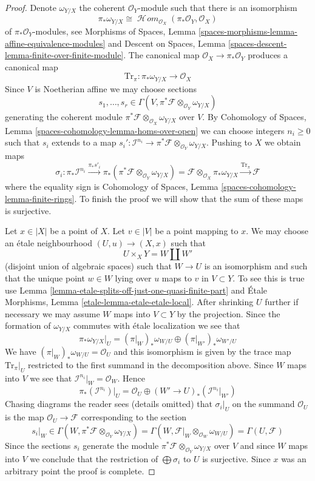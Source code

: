 \documentclass[10pt,a4paper]{amsart}
\theoremstyle{plain}
\theoremstyle{definition}
\theoremstyle{remark}
\numberwithin{equation}{subsection}
\def\SheafHom{\mathop{\mathcal{H}\!\mathit{om}}\nolimits}
\begin{document}
\begin{proof}
Denote $\omega_{Y/X}$ the coherent $\mathcal{O}_Y$-module such that there
is an isomorphism
$$
\pi_*\omega_{Y/X} \cong
\SheafHom_{\mathcal{O}_X}(\pi_*\mathcal{O}_Y, \mathcal{O}_X)
$$
of $\pi_*\mathcal{O}_Y$-modules, see Morphisms of Spaces, Lemma
\ref{spaces-morphisms-lemma-affine-equivalence-modules} and
Descent on Spaces, Lemma \ref{spaces-descent-lemma-finite-over-finite-module}.
The canonical map $\mathcal{O}_X \to \pi_*\mathcal{O}_Y$
produces a canonical map
$$
\text{Tr}_\pi : \pi_*\omega_{Y/X} \longrightarrow \mathcal{O}_X
$$
Since $V$ is Noetherian affine we may choose sections
$$
s_1, \ldots, s_r \in
\Gamma(V, \pi^*\mathcal{F} \otimes_{\mathcal{O}_Y} \omega_{Y/X})
$$
generating the coherent module
$\pi^*\mathcal{F} \otimes_{\mathcal{O}_X} \omega_{Y/X}$
over $V$. By
Cohomology of Spaces, Lemma \ref{spaces-cohomology-lemma-homs-over-open}
we can choose integers $n_i \geq 0$ such that $s_i$
extends to a map
$s_i' : \mathcal{I}^{n_i} \to
\pi^*\mathcal{F} \otimes_{\mathcal{O}_Y} \omega_{Y/X}$.
Pushing to $X$ we obtain maps
$$
\sigma_i :
\pi_*\mathcal{I}^{n_i}
\xrightarrow{\pi_*s'_i}
\pi_*(\pi^*\mathcal{F} \otimes_{\mathcal{O}_Y} \omega_{Y/X}) =
\mathcal{F} \otimes_{\mathcal{O}_X} \pi_*\omega_{Y/X}
\xrightarrow{\text{Tr}_\pi} \mathcal{F}
$$
where the equality sign is
Cohomology of Spaces, Lemma \ref{spaces-cohomology-lemma-finite-rings}.
To finish the proof we will show that the sum of these maps is surjective.

\medskip\noindent
Let $x \in |X|$ be a point of $X$. Let $v \in |V|$ be a point mapping to $x$.
We may choose an \'etale neighbourhood $(U, u) \to (X, x)$ such that
$$
U \times_X Y = W \coprod W'
$$
(disjoint union of algebraic spaces) such that $W \to U$ is an
isomorphism and such that the unique point $w \in W$ lying over
$u$ maps to $v$ in $V \subset Y$. To see this is true use
Lemma \ref{lemma-etale-splits-off-just-one-quasi-finite-part} and
\'Etale Morphisms, Lemma \ref{etale-lemma-etale-etale-local}.
After shrinking $U$ further if necessary we may assume $W$ maps into
$V \subset Y$ by the projection. Since the formation of $\omega_{Y/X}$
commutes with \'etale localization we see that
$$
\pi_*\omega_{Y/X}|_U = (\pi|_W)_*\omega_{W/U} \oplus (\pi|_{W'})_*\omega_{W'/U}
$$
We have $(\pi|_W)_*\omega_{W/U} = \mathcal{O}_U$ and this isomorphism
is given by the trace map $\text{Tr}_\pi|_U$ restricted
to the first summand in the decomposition above. Since $W$ maps
into $V$ we see that $\mathcal{I}^{n_i}|_W = \mathcal{O}_W$.
Hence
$$
\pi_*(\mathcal{I}^{n_i})|_U = \mathcal{O}_U \oplus
(W' \to U)_*(\mathcal{I}^{n_i}|_{W'})
$$
Chasing diagrams the reader sees (details omitted) that $\sigma_i|_U$
on the summand $\mathcal{O}_U$ is the map $\mathcal{O}_U \to \mathcal{F}$
corresponding to the section
$$
s_i|_W  \in
\Gamma(W,\pi^*\mathcal{F} \otimes_{\mathcal{O}_Y} \omega_{Y/X})
=
\Gamma(W, \mathcal{F}|_W \otimes_{\mathcal{O}_W} \omega_{W/U})
=
\Gamma(U, \mathcal{F})
$$
Since the sections $s_i$ generate the module
$\pi^*\mathcal{F} \otimes_{\mathcal{O}_Y} \omega_{Y/X}$
over $V$ and since $W$ maps into $V$ we conclude
that the restriction of $\bigoplus \sigma_i$ to $U$ is surjective.
Since $x$ was an arbitrary point the proof is complete.
\end{proof}
\end{document}
